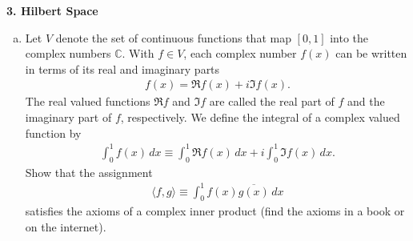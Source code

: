 \documentclass[11pt]{article}
\begin{document}
\newpage









\noindent \textbf{3. Hilbert Space}

\begin{enumerate}[(a)]
	\item Let $V$ denote the set of continuous functions that map $[0,1]$ into the complex numbers $\mathbb{C}$. With $f\in V$, each complex number $f(x)$ can be written in terms of its real and imaginary parts
	\begin{align*}
	f(x) = \Re{f(x)} + i\Im{f(x)}.
	\end{align*}
	The real valued functions $\Re{f}$ and $\Im{f}$ are called the real part of $f$ and the imaginary part of $f$, respectively. We define the integral of a complex valued function by 
	\begin{align*}
	\int^1_0 f(x)\,dx \equiv \int^1_0 \Re{f(x)}\,dx + i\int^1_0\Im{f(x)}\,dx.
	\end{align*}
	Show that the assignment 
	\begin{align*}
	\langle f,g \rangle \equiv \int^1_0 f(x)\overline{g(x)}\,dx
	\end{align*}
	satisfies the axioms of a complex inner product (find the axioms in a book or on the internet).
	
	
	
	
	
	
	

\end{enumerate}
\end{document}
